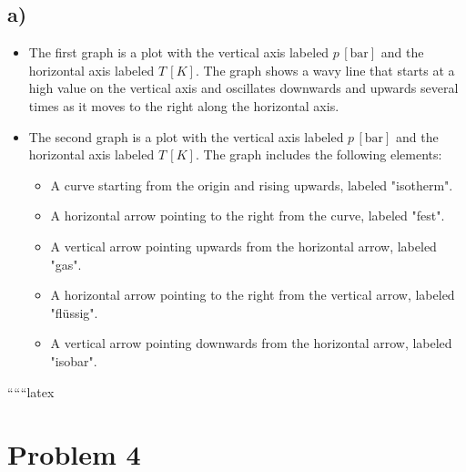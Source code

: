 

\subsection*{a)}

\begin{itemize}
    \item The first graph is a plot with the vertical axis labeled \( p \, [\text{bar}] \) and the horizontal axis labeled \( T \, [K] \). The graph shows a wavy line that starts at a high value on the vertical axis and oscillates downwards and upwards several times as it moves to the right along the horizontal axis.
\end{itemize}

\begin{itemize}
    \item The second graph is a plot with the vertical axis labeled \( p \, [\text{bar}] \) and the horizontal axis labeled \( T \, [K] \). The graph includes the following elements:
    \begin{itemize}
        \item A curve starting from the origin and rising upwards, labeled "isotherm".
        \item A horizontal arrow pointing to the right from the curve, labeled "fest".
        \item A vertical arrow pointing upwards from the horizontal arrow, labeled "gas".
        \item A horizontal arrow pointing to the right from the vertical arrow, labeled "flüssig".
        \item A vertical arrow pointing downwards from the horizontal arrow, labeled "isobar".
    \end{itemize}
\end{itemize}

``````latex


\section*{Problem 4}